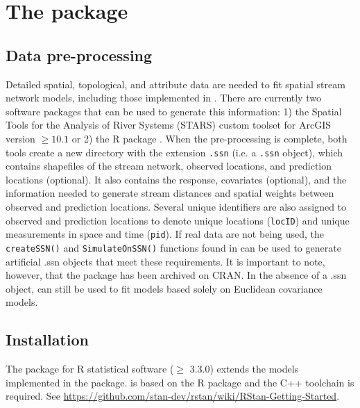 \section{The  package}
\label{sec:ssn}

\subsection{Data pre-processing}
Detailed spatial, topological, and attribute data are needed to fit spatial stream network models, including those implemented in . There are currently two software packages that can be used to generate this information: 1) the Spatial Tools for the Analysis of River Systems (STARS) custom toolset \citep{peterson2014stars} for ArcGIS version $\geq{10.1}$ \citep{esri} or 2) the R package  \citep{kattwinkel2020openSTARS}. 
When the pre-processing is complete, both tools create a new directory with the extension \texttt{.ssn} (i.e. a \texttt{.ssn} object), which contains shapefiles of the stream network, observed locations, and prediction locations (optional). It also contains the response, covariates (optional), and the information needed to generate stream distances and spatial weights between observed and prediction locations. Several unique identifiers are also assigned to observed and prediction locations to denote unique locations (\texttt{locID}) and unique measurements in space and time (\texttt{pid}). 
If real data are not being used, the \texttt{createSSN()} and \texttt{SimulateOnSSN()} functions found in  can be used to generate artificial .ssn objects that meet these requirements. It is important to note, however, that the  package has been archived on CRAN.
In the absence of a .ssn object,  can still be used to fit models based solely on Euclidean covariance models.


\subsection{Installation}

The  package for R statistical software ($\geq$ 3.3.0) extends the models implemented in the  package. %
 is based on the R package  and the C++ toolchain is required. See 
\url{https://github.com/stan-dev/rstan/wiki/RStan-Getting-Started}.

